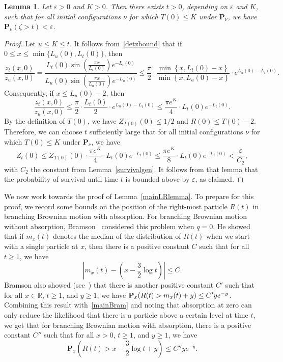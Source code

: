 \documentclass[10pt]{amsart}
\newtheorem{lemm}[theo]{Lemma}\newtheorem{prop}[theo]{Proposition}\newtheorem{coro}[theo]{Corollary}\newtheorem{conj}[theo]{Conjecture}
\theoremstyle{definition}\newtheorem{defi}[theo]{Definition}\newtheorem{rema}[theo]{Remark}\newtheorem{exam}[theo]{Example}\newtheorem{exem}[theo]{Example}\newtheorem{nota}[theo]{Notation}
\newcommand*\eps{\varepsilon}
\renewcommand*\P{\mathbf{P}}
\newcommand*\R{\mathbb{R}}
\newcommand{\1} {\mathds{1}}
\begin{document}
\begin{lemm}\label{smallTlem}
Let $\eps > 0$ and $K > 0$. Then there exists $t > 0$, depending on $\eps$ and $K$, such that for all initial configurations $\nu$ for which $T(0) \leq K$ under $\P_\nu$, we have $\P_{\nu}(\zeta > t) < \eps$.
\end{lemm}

\begin{proof}
Let $u \leq K \leq t$. It follows from~\eqref{detzbound} that if $0 \leq x \leq \min\{L_u(0), L_t(0)\}$, then
\[
\frac{z_t(x,0)}{z_u(x,0)} = \frac{L_t(0) \sin\left(\frac{\pi x}{L_t(0)}\right) e^{-L_t(0)}}{L_u(0) \sin\left(\frac{\pi x}{L_u(0)}\right) e^{-L_u(0)}} \leq \frac{\pi}{2} \cdot \frac{\min\left\{x, L_t(0) - x\right\}}{\min\left\{x, L_u(0) - x\right\}} \cdot e^{L_u(0) - L_t(0)}.
\]
Consequently, if $x \leq L_u(0) - 2$, then
\begin{equation}\label{KZratio}
\frac{z_t(x,0)}{z_u(x,0)} \leq \frac{\pi}{2} \cdot \frac{L_t(0)}{2} \cdot e^{L_u(0) - L_t(0)} \leq \frac{\pi e^K}{4} \cdot L_t(0) e^{-L_t(0)}.
\end{equation}
By the definition of $T(0)$, we have $Z_{T(0)}(0) \leq 1/2$ and $R(0) \leq T(0) - 2$. Therefore, we can choose $t$ sufficiently large that for all initial configurations $\nu$ for which $T(0) \leq K$ under $\P_\nu$, we have
\[
Z_t(0) \leq Z_{T(0)}(0) \cdot \frac{\pi e^K}{4} \cdot L_t(0) e^{-L_t(0)} \leq \frac{\pi e^K}{8} \cdot L_t(0) e^{-L_t(0)} < \frac{\eps}{C_2},
\]
with $C_2$ the constant from Lemma~\ref{survivalgen}. It follows from that lemma that the probability of survival until time $t$ is bounded above by $\eps$, as claimed.
\end{proof}

We now work towards the proof of Lemma~\ref{mainLRlemma}. To prepare for this proof, we record some bounds on the position of the right-most particle $R(t)$ in branching Brownian motion with absorption. For branching Brownian motion without absorption, Bramson~\cite{bram83} considered this problem when $q = 0$. He showed that if $m_x(t)$ denotes the median of the distribution of $R(t)$ when we start with a single particle at $x$, then there is a positive constant $C$ such that for all $t \geq 1$, we have
\begin{equation}\label{mainBram}
\left|m_x(t) - \left(x - \frac{3}{2} \log t \right) \right| \leq C.
\end{equation}
Bramson also showed (see~\cite[equation~(8.17)]{bram83}) that there is another positive constant $C'$ such that for all $x \in \R$, $t \geq 1$, and $y \geq 1$, we have $\P_x(R(t) > m_x(t) + y)\linebreak \leq C' y e^{-y}$. Combining this result with~\eqref{mainBram} and noting that absorption at zero can only reduce the likelihood that there is a particle above a certain level at time $t$, we get that for branching Brownian motion with absorption, there is a positive constant $C''$ such that for all $x > 0$, $t \geq 1$, and $y \geq 1$, we have
\begin{equation}\label{Bramabs}
\P_x\left(R(t) > x - \frac{3}{2} \log t + y \right) \leq C'' y e^{-y}.
\end{equation}
\end{document}
